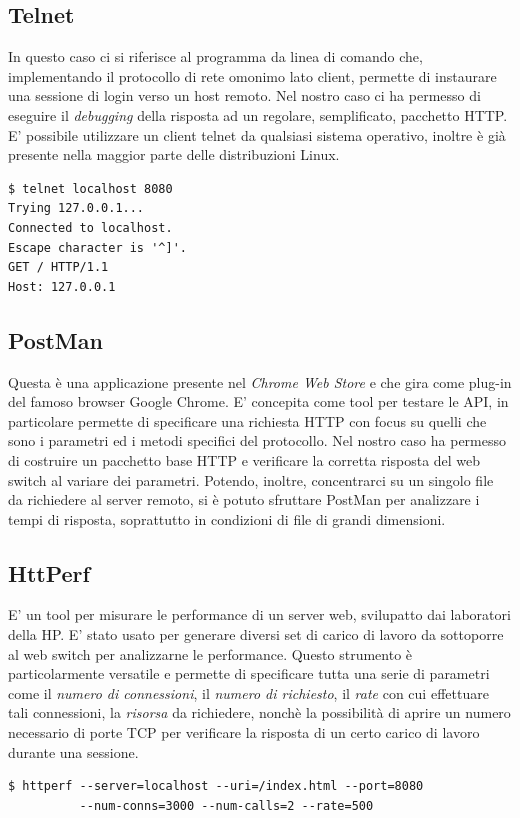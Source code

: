 \documentclass[italian]{tktltiki2}
\begin{document}
\subsection{Telnet}
In questo caso ci si riferisce al programma da linea di comando che, implementando il protocollo di rete omonimo lato client, permette di instaurare una sessione di login verso un host remoto. Nel nostro caso ci ha permesso di eseguire il \emph{debugging} della risposta ad un regolare, semplificato, pacchetto HTTP. E' possibile utilizzare un client telnet da qualsiasi sistema operativo, inoltre è già presente nella maggior parte delle distribuzioni Linux.
\begin{lstlisting}
$ telnet localhost 8080
Trying 127.0.0.1...
Connected to localhost.
Escape character is '^]'.
GET / HTTP/1.1
Host: 127.0.0.1

\end{lstlisting}
\subsection{PostMan}
Questa è una applicazione presente nel \emph{Chrome Web Store} e che gira come plug-in del famoso browser Google Chrome. E' concepita come tool per testare le API, in particolare permette di specificare una richiesta HTTP con focus su quelli che sono i parametri ed i metodi specifici del protocollo. Nel nostro caso ha permesso di costruire un pacchetto base HTTP e verificare la corretta risposta del web switch al variare dei parametri. Potendo, inoltre, concentrarci su un singolo file da richiedere al server remoto, si è potuto sfruttare PostMan per analizzare i tempi di risposta, soprattutto in condizioni di file di grandi dimensioni.
\subsection{HttPerf} \label{ssec: httperf}
E' un tool per misurare le performance di un server web, svilupatto dai laboratori della HP. E' stato usato per generare diversi set di carico di lavoro da sottoporre al web switch per analizzarne le performance. Questo strumento è particolarmente versatile e permette di specificare tutta una serie di parametri come il \emph{numero di connessioni}, il \emph{numero di richiesto}, il \emph{rate} con cui effettuare tali connessioni, la \emph{risorsa} da richiedere, nonchè la possibilità di aprire un numero necessario di porte TCP per verificare la risposta di un certo carico di lavoro durante una sessione.
\begin{lstlisting}
$ httperf --server=localhost --uri=/index.html --port=8080
          --num-conns=3000 --num-calls=2 --rate=500

\end{lstlisting}
\end{document}
